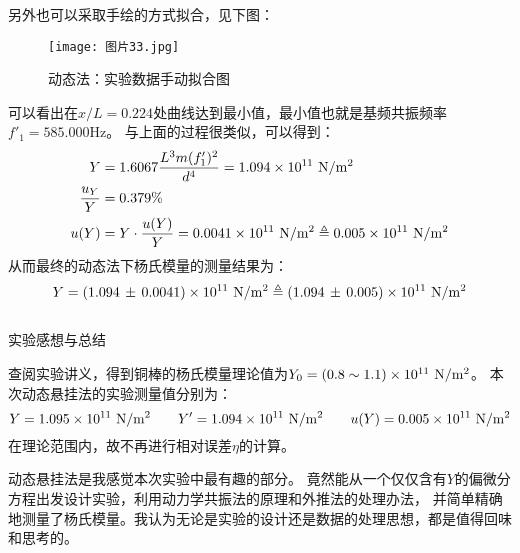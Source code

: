\documentclass[11pt]{article}
\begin{document}
\newpage
另外也可以采取手绘的方式拟合，见下图：
\begin{figure}[H]
    \centering
    \texttt{[image: 图片33.jpg]}
    \caption{动态法：实验数据手动拟合图}
\end{figure}

可以看出在$x/L=0.224$处曲线达到最小值，最小值也就是基频共振频率$f'_1=585.000$Hz。
与上面的过程很类似，可以得到：
    \begin{align*}
         Y&=1.6067\frac{L^3m(f'_1)^2}{d^4}=1.094\times 10^{11}\,\,{\rm N/m^2}\\
        \frac{u_Y}{Y}
        &=0.379\%
        \\ u(Y)&=Y\cdot\frac{u(Y)}{Y}=0.0041\times 10^{11}\,\,{\rm N/m^2}\triangleq0.005\times10^{11}\,\,{\rm N/m^2}
    \end{align*}
从而最终的动态法下杨氏模量的测量结果为：  
    \[
        Y=(1.094\,\pm\,0.0041) \times10^{11}\,\,{\rm N/m^2}\triangleq (1.094\,\pm \,0.005)\times10^{11}\,\,{\rm N/m^2}
    \]



\subsection[动态法测量杨氏模量：实验总结 ]{}
\begin{center}
    \begin{tcolorbox}[colback=gray!10,%
                      colframe=black,%
                      width=5cm,%
                      arc=1mm, auto outer arc,
                      boxrule=0.5pt,
                     ]
                     \begin{center}
                    实验感想与总结      
                     \end{center}
    \end{tcolorbox}
\end{center}

查阅实验讲义，得到铜棒的杨氏模量理论值为$Y_0=(0.8\sim 1.1)\times 10^{11}\,\,{\rm N/m^2}$。
本次动态悬挂法的实验测量值分别为：
\[
  Y=1.095\times10^{11}\,\,{\rm N/m^2}\qquad   Y'=1.094\times10^{11}\,\,{\rm N/m^2}\qquad u(Y)=0.005\times10^{11}\,\,{\rm N/m^2}     
\]
在理论范围内，故不再进行相对误差$\eta$的计算。

动态悬挂法是我感觉本次实验中最有趣的部分。
竟然能从一个仅仅含有$Y$的偏微分方程出发设计实验，利用动力学共振法的原理和外推法的处理办法，
并简单精确地测量了杨氏模量。我认为无论是实验的设计还是数据的处理思想，都是值得回味和思考的。
\end{document}
